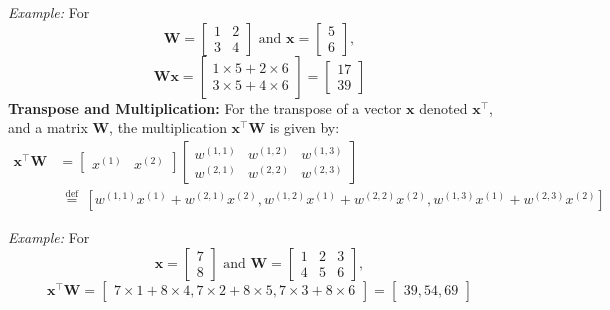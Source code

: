 \emph{Example:} For
\[ \mathbf{W} = \left[\begin{array}{ll}
			1 & 2 \\
			3 & 4
		\end{array}\right] \text{ and } \mathbf{x} = \left[\begin{array}{l}
			5 \\
			6
		\end{array}\right], \]
\[ \mathbf{W} \mathbf{x} = \left[\begin{array}{l}
			1 \times 5 + 2 \times 6 \\
			3 \times 5 + 4 \times 6
		\end{array}\right] = \left[\begin{array}{l}
			17 \\
			39
		\end{array}\right] \]
\textbf{Transpose and Multiplication:}
For the transpose of a vector \( \mathbf{x} \) denoted \( \mathbf{x}^{\top} \), and a matrix \( \mathbf{W} \), the multiplication \( \mathbf{x}^{\top} \mathbf{W} \) is given by:
$$
	\begin{aligned}
		\mathbf{x}^{\top} \mathbf{W} & =\left[\begin{array}{ll}
				                                      x^{(1)} & x^{(2)}
			                                      \end{array}\right]\left[\begin{array}{lll}
				                                                              w^{(1,1)} & w^{(1,2)} & w^{(1,3)} \\
				                                                              w^{(2,1)} & w^{(2,2)} & w^{(2,3)}
			                                                              \end{array}\right]                                                                                      \\
		                             & \stackrel{\text { def }}{=}\left[w^{(1,1)} x^{(1)}+w^{(2,1)} x^{(2)}, w^{(1,2)} x^{(1)}+w^{(2,2)} x^{(2)}, w^{(1,3)} x^{(1)}+w^{(2,3)} x^{(2)}\right]
	\end{aligned}
$$

\emph{Example:} For
\[ \mathbf{x} = \left[\begin{array}{l}
			7 \\
			8
		\end{array}\right] \text{ and } \mathbf{W} = \left[\begin{array}{lll}
			1 & 2 & 3 \\
			4 & 5 & 6
		\end{array}\right], \]
\[ \mathbf{x}^{\top} \mathbf{W} = \left[\begin{array}{lll}
			7 \times 1 + 8 \times 4, 7 \times 2 + 8 \times 5, 7 \times 3 + 8 \times 6
		\end{array}\right] = \left[\begin{array}{lll}
			39, 54, 69
		\end{array}\right] \]

